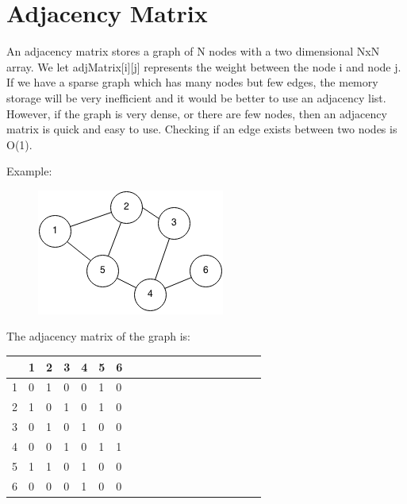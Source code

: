 \documentclass[11pt,oneside]{book}
\makeatletter
\def\maxwidth#1{\ifdim\Gin@nat@width>#1 #1\else\Gin@nat@width\fi}
\makeatother
\begin{document}
        \section{ Adjacency Matrix }
        

An adjacency matrix stores a graph of N nodes with a two dimensional NxN array. We let adjMatrix[i][j] represents the weight between the node i and node j. If we have a sparse graph which has many nodes but few edges, the memory storage will be very inefficient and it would be better to use an adjacency list. However, if the graph is very dense, or there are few nodes, then an adjacency matrix is quick and easy to use. Checking if an edge exists between two nodes is O(1).

Example:

\vspace{5px}\begin{figure}[H]\centering
        \includegraphics[width=0.66\maxwidth{\textwidth}]{graph.png}
        \end{figure}

The adjacency matrix of the graph is:

\begin{center}\begin{tabulary}{0.4\linewidth}{|l|l|l|l|l|l|l|l|l|l|l|l|l|l|l|l|l|l|l}\hline


   &
  1 &
  2 &
  3 &
  4 &
  5 &
  6\\
\hline


  1 &
  0 &
  1 &
  0 &
  0 &
  1 &
  0\\

  2 &
  1 &
  0 &
  1 &
  0 &
  1 &
  0\\

  3 &
  0 &
  1 &
  0 &
  1 &
  0 &
  0\\

  4 &
  0 &
  0 &
  1 &
  0 &
  1 &
  1\\

  5 &
  1 &
  1 &
  0 &
  1 &
  0 &
  0\\

  6 &
  0 &
  0 &
  0 &
  1 &
  0 &
  0\\

\hline\end{tabulary}\end{center}
\end{document}
